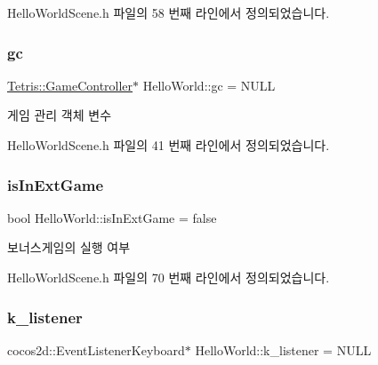 Hello\+World\+Scene.\+h 파일의 58 번째 라인에서 정의되었습니다.

\mbox{\label{class_hello_world_a547cb213126911d9a7151f8259dc7102}} 
\subsubsection{\texorpdfstring{gc}{gc}}
{\footnotesize\ttfamily \hyperlink{class_tetris_1_1_game_controller}{Tetris\+::\+Game\+Controller}$\ast$ Hello\+World\+::gc = N\+U\+LL\hspace{0.3cm}{\ttfamily [protected]}}



게임 관리 객체 변수 



Hello\+World\+Scene.\+h 파일의 41 번째 라인에서 정의되었습니다.

\mbox{\label{class_hello_world_a6dcd196f83b5eba681717366944fcddf}} 
\subsubsection{\texorpdfstring{is\+In\+Ext\+Game}{isInExtGame}}
{\footnotesize\ttfamily bool Hello\+World\+::is\+In\+Ext\+Game = false\hspace{0.3cm}{\ttfamily [protected]}}



보너스게임의 실행 여부 



Hello\+World\+Scene.\+h 파일의 70 번째 라인에서 정의되었습니다.

\mbox{\label{class_hello_world_a70a88f59eefadb6a03bd0b3d0ec9cc88}} 
\subsubsection{\texorpdfstring{k\+\_\+listener}{k\_listener}}
{\footnotesize\ttfamily cocos2d\+::\+Event\+Listener\+Keyboard$\ast$ Hello\+World\+::k\+\_\+listener = N\+U\+LL\hspace{0.3cm}{\ttfamily [protected]}}



